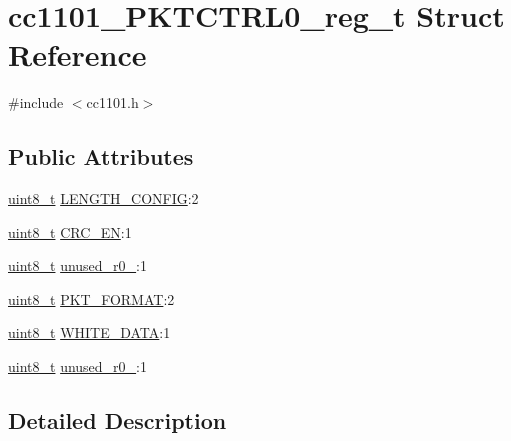\hypertarget{structcc1101___p_k_t_c_t_r_l0__reg__t}{}\section{cc1101\+\_\+\+P\+K\+T\+C\+T\+R\+L0\+\_\+reg\+\_\+t Struct Reference}
\label{structcc1101___p_k_t_c_t_r_l0__reg__t}


{\ttfamily \#include $<$cc1101.\+h$>$}

\subsection*{Public Attributes}
\begin{DoxyCompactItemize}
\item 
\hyperlink{_p_e___types_8h_aba7bc1797add20fe3efdf37ced1182c5}{uint8\+\_\+t} \hyperlink{structcc1101___p_k_t_c_t_r_l0__reg__t_a1be4bc608c20297a3e39d7f87782dc47}{L\+E\+N\+G\+T\+H\+\_\+\+C\+O\+N\+F\+IG}\+:2
\item 
\hyperlink{_p_e___types_8h_aba7bc1797add20fe3efdf37ced1182c5}{uint8\+\_\+t} \hyperlink{structcc1101___p_k_t_c_t_r_l0__reg__t_a0199bd9be4196b65d6159523f2e83630}{C\+R\+C\+\_\+\+EN}\+:1
\item 
\hyperlink{_p_e___types_8h_aba7bc1797add20fe3efdf37ced1182c5}{uint8\+\_\+t} \hyperlink{structcc1101___p_k_t_c_t_r_l0__reg__t_a0ff030087e4700cf1bc5f2f5a84403f7}{unused\+\_\+r0\+\_}\+:1
\item 
\hyperlink{_p_e___types_8h_aba7bc1797add20fe3efdf37ced1182c5}{uint8\+\_\+t} \hyperlink{structcc1101___p_k_t_c_t_r_l0__reg__t_a7a4062d156e7b0d10fc69ebc0c47117e}{P\+K\+T\+\_\+\+F\+O\+R\+M\+AT}\+:2
\item 
\hyperlink{_p_e___types_8h_aba7bc1797add20fe3efdf37ced1182c5}{uint8\+\_\+t} \hyperlink{structcc1101___p_k_t_c_t_r_l0__reg__t_a1ba08c7554f828c59c48933c13e23726}{W\+H\+I\+T\+E\+\_\+\+D\+A\+TA}\+:1
\item 
\hyperlink{_p_e___types_8h_aba7bc1797add20fe3efdf37ced1182c5}{uint8\+\_\+t} \hyperlink{structcc1101___p_k_t_c_t_r_l0__reg__t_a801f05214c26acd693259f5e126d32ff}{unused\+\_\+r0\+\_}\+:1
\end{DoxyCompactItemize}


\subsection{Detailed Description}


